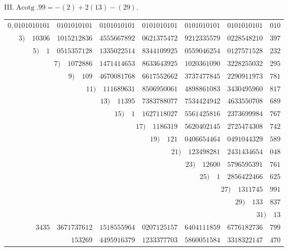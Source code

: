 \par{}
%
\begin{center}III.\quad $\operatorname{Acotg}.99=-(2)+2(13)-(29).$\end{center}
\begingroup\fontsize{8.5}{11}\selectfont\setlength{\tabcolsep}{2pt}
\begin{longtable}{@{}rrrrrrr@{}}
\hline
$0{,}0101010101$ & $0101010101$ & $0101010101$ & $0101010101$ & $0101010101$ & $0101010101$ & $010$\\
$3)\quad 10306$ & $1015212836$ & $4555667892$ & $0621375472$ & $9212335579$ & $0228548210$ & $397$\\
$5)\quad 1$ & $0515357128$ & $1335022514$ & $8344109925$ & $0559046254$ & $0127571528$ & $232$\\
\multicolumn{2}{r}{$7)\quad 1072886$} & $1471414653$ & $8633643925$ & $1020361090$ & $3228255032$ & $295$\\
\multicolumn{2}{r}{$9)\quad 109$} & $4670081768$ & $6617552662$ & $3737477845$ & $2290911973$ & $781$\\
 & \multicolumn{2}{r}{$11)\quad 111689631$} & $8506950061$ & $4898861083$ & $3430495960$ & $817$\\
 & \multicolumn{2}{r}{$13)\quad 11395$} & $7383788077$ & $7534424942$ & $4633550708$ & $689$\\
 & \multicolumn{2}{r}{$15)\quad 1$} & $1627118027$ & $5561425816$ & $2373699984$ & $767$\\
 &  & \multicolumn{2}{r}{$17)\quad 1186319$} & $5620402145$ & $2725474308$ & $742$\\
 &  & \multicolumn{2}{r}{$19)\quad 121$} & $0406654464$ & $0491044329$ & $589$\\
 &  &  & \multicolumn{2}{r}{$21)\quad 123498281$} & $2431434654$ & $048$\\
 &  &  & \multicolumn{2}{r}{$23)\quad 12600$} & $5796595391$ & $761$\\
 &  &  & \multicolumn{2}{r}{$25)\quad 1$} & $2856422466$ & $625$\\
 &  &  &  & \multicolumn{2}{r}{$27)\quad 1311745$} & $991$\\
 &  &  &  & \multicolumn{2}{r}{$29)\quad 133$} & $837$\\
 &  &  &  &  & \multicolumn{2}{r}{$31)\quad 13$}\\
\hline
$3435$ & $3671737612$ & $1518555964$ & $0207125157$ & $6404111859$ & $6776182736$ & $799$\\
 & $153269$ & $4495916379$ & $1233377703$ & $5860051584$ & $3318322147$ & $470$\\

\end{longtable}
